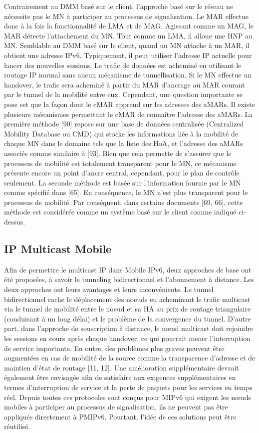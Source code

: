 Contrairement au DMM basé sur le client, l'approche basé sur le réseau ne nécessite pas le MN à participer au processus de signalisation. Le MAR effectue donc à la fois la fonctionnalité de LMA et de MAG. Agissant comme un MAG, le MAR détecte l'attachement du MN. Tout comme un LMA, il alloue une HNP au MN. Semblable au DMM basé sur le client, quand un MN attache à un MAR, il obtient une adresse IPv6. Typiquement, il peut utiliser l'adresse IP actuelle pour lancer des nouvelles sessions. Le trafic de données est acheminé en utilisant le routage IP normal sans aucun mécanisme de tunnellisation. Si le MN effectue un handover, le trafic sera acheminé à partir du MAR d'ancrage au MAR courant par le tunnel de la mobilité entre eux. Cependant, une question importante se pose est que la façon dont le cMAR apprend sur les adresses des aMARs. Il existe plusieurs mécanismes permettant le cMAR de connaître l'adresse des aMARs. La première méthode [90] repose sur une base de données centralisée (Centralized Mobility Database ou CMD) qui stocke les informations liée à la mobilité de chaque MN dans le domaine tels que la liste des HoA, et l'adresse des aMARs associés comme similaire à [93]. Bien que cela permette de s'assurer que le processus de mobilité est totalement transparent pour le MN, ce mécanisme présente encore un point d'ancre central, cependant, pour le plan de contrôle seulement. La seconde méthode est basée sur l'information fournie par le MN comme spécifié dans [65]. En conséquence, le MN n'est plus transparent pour le processus de mobilité. Par conséquent, dans certains documents [69, 66], cette méthode est considérée comme un système basé sur le client comme indiqué ci-dessus.


\subsection{IP Multicast Mobile}

Afin de permettre le multicast IP dans Mobile IPv6, deux approches de base ont été proposées, à savoir le tunneling bidirectionnel et l'abonnement à distance. Les deux approches ont leurs avantages et leurs inconvénients. Le tunnel bidirectionnel cache le déplacement des noeuds en acheminant le trafic multicast via le tunnel de mobilité entre le noeud et sa HA au prix de routage triangulaire (conduisant à un long délai) et le problème de la convergence du tunnel. D'autre part, dans l'approche de souscription à distance, le nœud multicast doit rejoindre les sessions en cours après chaque handover, ce qui pourrait mener l'interruption de service importante. En outre, des problèmes plus graves peuvent être augmentées en cas de mobilité de la source comme la transparence d'adresse et de maintien d'état de routage [11, 12]. Une amélioration supplémentaire devrait également être envisagée afin de satisfaire aux exigences supplémentaires en termes d'interruption de service et la perte de paquets pour les services en temps réel. Depuis toutes ces protocoles sont conçus pour MIPv6 qui exigent les nœuds mobiles à participer au processus de signalisation, ils ne peuvent pas être appliqués directement à PMIPv6. Pourtant, l'idée de ces solutions peut être réutilisé.

